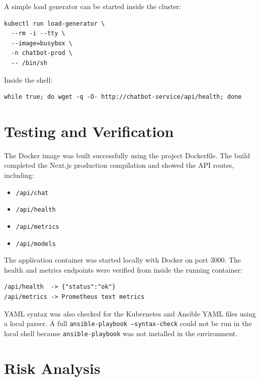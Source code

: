 \documentclass[12pt,a4paper]{article}
\begin{document}
A simple load generator can be started inside the cluster:

\begin{lstlisting}[style=projectcode]
kubectl run load-generator \
  --rm -i --tty \
  --image=busybox \
  -n chatbot-prod \
  -- /bin/sh
\end{lstlisting}

Inside the shell:

\begin{lstlisting}[style=projectcode]
while true; do wget -q -O- http://chatbot-service/api/health; done
\end{lstlisting}

\section{Testing and Verification}

The Docker image was built successfully using the project Dockerfile. The build
completed the Next.js production compilation and showed the API routes,
including:

\begin{itemize}[leftmargin=*]
    \item \texttt{/api/chat}
    \item \texttt{/api/health}
    \item \texttt{/api/metrics}
    \item \texttt{/api/models}
\end{itemize}

The application container was started locally with Docker on port 3000. The
health and metrics endpoints were verified from inside the running container:

\begin{lstlisting}[style=projectcode]
/api/health  -> {"status":"ok"}
/api/metrics -> Prometheus text metrics
\end{lstlisting}

YAML syntax was also checked for the Kubernetes and Ansible YAML files using a
local parser. A full \texttt{ansible-playbook --syntax-check} could not be run
in the local shell because \texttt{ansible-playbook} was not installed in the
environment.

\section{Risk Analysis}
\end{document}
